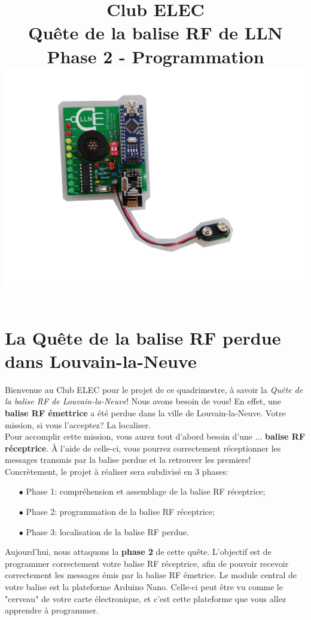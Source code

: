 \documentclass[a4paper,10pt,twoside]{article}
\title{	
	\vspace{2.5cm}
	\normalfont \normalsize 
	\huge Club ELEC\\ 
	\huge Quête de la balise RF de LLN\\
	\huge Phase 2 - Programmation
	\includegraphics[width=.9\textwidth]{imgs/RF_TAG_withoutBackground.jpg}
	\vspace{2.5cm}
	\centering
}
\begin{document}
\renewcommand{\figurename}{Fig.}
\renewcommand{\thepage}{\roman{page}}
\setcounter{page}{1}

\maketitle
\newpage
{}
\pagestyle{main}

\newpage
\null
\thispagestyle{empty}
\newpage
\clearpage

\setcounter{page}{1}

\section*{La Quête de la balise RF perdue dans Louvain-la-Neuve}

Bienvenue au Club ELEC pour le projet de ce quadrimestre, à savoir la \textit{Quête de la balise RF de Louvain-la-Neuve}! Nous avons besoin de vous! En effet, une \textbf{balise RF émettrice} a été perdue dans la ville de Louvain-la-Neuve. Votre mission, si vous l'acceptez? La localiser.\\ 

Pour accomplir cette mission, vous aurez tout d'abord besoin d'une ... \textbf{balise RF réceptrice}. À l'aide de celle-ci, vous pourrez correctement réceptionner les messages transmis par la balise perdue et la retrouver les premiers!
\\

Concrètement, le projet à réaliser sera subdivisé en 3 phases:\\
\begin{itemize}
	\item[$\bullet$] Phase 1: compréhension et assemblage de la balise RF réceptrice;
	\item[$\bullet$] Phase 2: programmation de la balise RF réceptrice;
	\item[$\bullet$] Phase 3: localisation de la balise RF perdue. \newline
\end{itemize}

Aujourd'hui, nous attaquons la \textbf{phase 2} de cette quête. L'objectif est de programmer correctement votre balise RF réceptrice, afin de pouvoir recevoir correctement les messages émis par la balise RF émetrice. Le module central de votre balise est la plateforme Arduino Nano. Celle-ci peut être vu comme le "cerveau" de votre carte  électronique, et c'est cette plateforme que vous allez apprendre à programmer.
\end{document}
